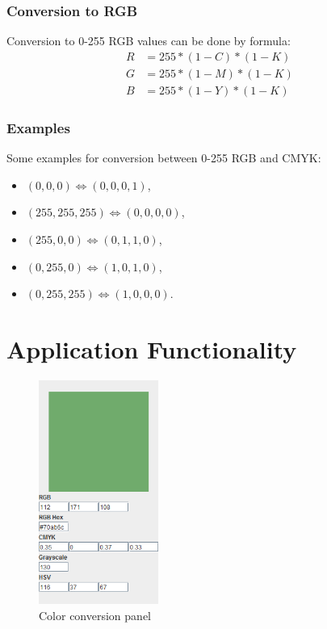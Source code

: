 \documentclass[titlepage]{article}
\begin{document}
\subsubsection{Conversion to RGB}
Conversion to 0-255 RGB values can be done by formula:
\begin{equation}
\begin{split}
R&=255*(1-C)*(1-K)\\
G&=255*(1-M)*(1-K)\\
B&=255*(1-Y)*(1-K)
\end{split}
\end{equation}

\subsubsection{Examples}
Some examples for conversion between 0-255 RGB and CMYK:
\begin{itemize}
  \item $(0, 0, 0) \Leftrightarrow (0, 0, 0, 1)$,
  \item $(255, 255, 255) \Leftrightarrow (0, 0, 0, 0)$,
  \item $(255, 0, 0) \Leftrightarrow (0, 1, 1, 0)$,
  \item $(0, 255, 0) \Leftrightarrow (1, 0, 1, 0)$,
  \item $(0, 255, 255) \Leftrightarrow (1, 0, 0, 0)$.
\end{itemize}

\section{Application Functionality}

\begin{figure}[!htb]
	\centering
	\includegraphics[width=0.35\textwidth]{img/conversion.png} 
	\caption{Color conversion panel}
\end{figure}
\end{document}
